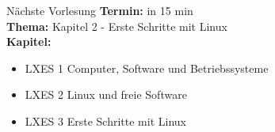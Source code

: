 \documentclass[aspectratio=43]{beamer}
\begin{document}

\begin{frame}[plain]
\begin{alertblock}{Nächste Vorlesung}
\textbf{Termin:} in 15 min\\
\textbf{Thema:} Kapitel 2 - Erste Schritte mit Linux \\
\textbf{Kapitel:} 
\begin{itemize}
\item LXES 1 Computer, Software und Betriebssysteme
\item LXES 2 Linux und freie Software
\item LXES 3 Erste Schritte mit Linux
\end{itemize}
\end{alertblock}
\end{frame}

\materialframe
\end{document}
